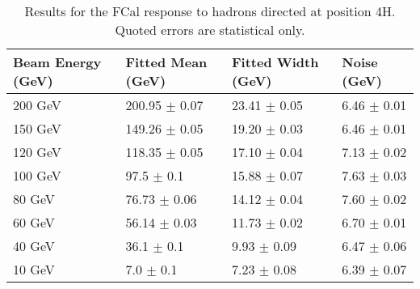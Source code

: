 \begin{table}[!htb]
\begin{center}
\begin{tabular}{|l|l|l|l|}
\hline
Beam Energy (GeV) & Fitted Mean (GeV)& Fitted Width (GeV)& Noise (GeV) \\
\hline
200 GeV  &  200.95 $\pm$    0.07 &   23.41 $\pm$    0.05 &    6.46 $\pm$    0.01 \\
150 GeV  &  149.26 $\pm$    0.05 &   19.20 $\pm$    0.03 &    6.46 $\pm$    0.01 \\
120 GeV  &  118.35 $\pm$    0.05 &   17.10 $\pm$    0.04 &    7.13 $\pm$    0.02 \\
100 GeV  &   97.5 $\pm$    0.1 &   15.88 $\pm$    0.07 &    7.63 $\pm$    0.03 \\
80 GeV  &   76.73 $\pm$    0.06 &   14.12 $\pm$    0.04 &    7.60 $\pm$    0.02 \\
60 GeV  &   56.14 $\pm$    0.03 &   11.73 $\pm$    0.02 &    6.70 $\pm$    0.01 \\
40 GeV  &   36.1 $\pm$    0.1 &    9.93 $\pm$    0.09 &    6.47 $\pm$    0.06 \\
10 GeV  &    7.0 $\pm$    0.1 &    7.23 $\pm$    0.08 &    6.39 $\pm$    0.07 \\
\hline
\end{tabular}
\end{center}
\caption{Results for the FCal response to hadrons directed at position 4H. Quoted errors are statistical only.}
\label{TBres_table_hadron_4H}
\end{table}
